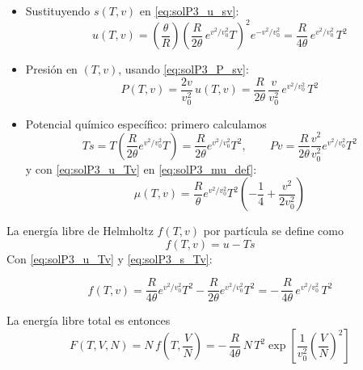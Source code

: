 \documentclass{article}
\begin{document}
\begin{itemize}
  \item[\(\bullet\)] Sustituyendo \(s(T,v)\) en \eqref{eq:solP3_u_sv}:
  \begin{equation}
  u(T,v)
  = \left(\frac{\theta}{R}\right)
    \left(\frac{R}{2\theta}\,e^{v^{2}/v_{0}^{2}}T\right)^{2}
    e^{-v^{2}/v_{0}^{2}}
  = \frac{R}{4\theta}\,e^{v^{2}/v_{0}^{2}}\,T^{2}
  \label{eq:solP3_u_Tv}
  \end{equation}

  \item[\(\bullet\)] Presión en \((T,v)\), usando \eqref{eq:solP3_P_sv}:
  \begin{equation}
  P(T,v)
  = \frac{2v}{v_{0}^{2}}\,u(T,v)
  = \frac{R}{2\theta}\,\frac{v}{v_{0}^{2}}\,
    e^{v^{2}/v_{0}^{2}}\,T^{2}
  \label{eq:solP3_P_Tv}
  \end{equation}

  \item[\(\bullet\)] Potencial químico específico:
  primero calculamos
  \[
  T s
  = T\left(\frac{R}{2\theta}e^{v^{2}/v_{0}^{2}}T\right)
  = \frac{R}{2\theta}e^{v^{2}/v_{0}^{2}}T^{2},
  \qquad
  P v
  = \frac{R}{2\theta}\frac{v^{2}}{v_{0}^{2}}
    e^{v^{2}/v_{0}^{2}}T^{2}
  \]
  y con \eqref{eq:solP3_u_Tv} en \eqref{eq:solP3_mu_def}:
  \begin{equation}
  \mu(T,v)
  = \frac{R}{\theta}e^{v^{2}/v_{0}^{2}}T^{2}
    \left(
      -\frac{1}{4} + \frac{v^{2}}{2v_{0}^{2}}
    \right)
  \label{eq:solP3_mu_Tv}
  \end{equation}
\end{itemize}

\vspace{0.3cm}

La energía libre de Helmholtz \textcolor{Tarawera}{\(f(T,v)\)} por partícula se define como
\[
f(T,v) = u - Ts
\]
Con \eqref{eq:solP3_u_Tv} y \eqref{eq:solP3_s_Tv}:

\begin{equation}
f(T,v)
= \frac{R}{4\theta}e^{v^{2}/v_{0}^{2}}T^{2}
  - \frac{R}{2\theta}e^{v^{2}/v_{0}^{2}}T^{2}
= -\,\frac{R}{4\theta}\,e^{v^{2}/v_{0}^{2}}\,T^{2}
\label{eq:solP3_f_Tv}
\end{equation}

La energía libre total es entonces
\begin{equation}
\boxed{
F(T,V,N)
= N\,f\!\left(T,\frac{V}{N}\right)
= -\,\frac{R}{4\theta}\,N\,T^{2}
   \exp\!\left[\frac{1}{v_{0}^{2}}\left(\frac{V}{N}\right)^{2}\right]
}
\label{eq:solP3_F_TVN}
\end{equation}
\end{document}
